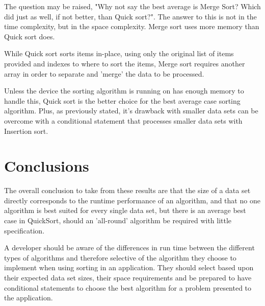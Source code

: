 \documentclass{acm_proc_article-sp}
\begin{document}
The question may be raised, "Why not say the best average is 
Merge Sort? Which did just as well, if not better, than Quick sort?".
The answer to this is not in the time complexity, but in the space
complexity. Merge sort uses more memory than Quick sort does.

While Quick sort sorts items in-place, using only the original list
of items provided and indexes to where to sort the items, 
Merge sort requires another array in order to separate and 
'merge' the data to be processed.

Unless the device the
 sorting algorithm is running on has enough memory to
 handle this, Quick sort is the better choice for the best average
case sorting algorithm. Plus, as previously stated, it's drawback
with smaller data sets can be overcome with a conditional statement
that processes smaller data sets with Insertion sort.

\section{Conclusions}

The overall conclusion to take from these results are that the
size of a data set directly corresponds to the runtime performance of
an algorithm, and that no one algorithm is best suited for every
single data set, but there is an average best case in QuickSort, 
should an 'all-round' algorithm be required with little specification.

A developer 
should be aware of the differences in run time between the different types
of algorithms and therefore selective of the algorithm they choose to implement 
when using sorting in an application. They should select based upon their 
expected data set sizes, their space requirements and be prepared
to have conditional statements to choose the best algorithm for 
a problem presented to the application.




%
%
%
%
\end{document}
